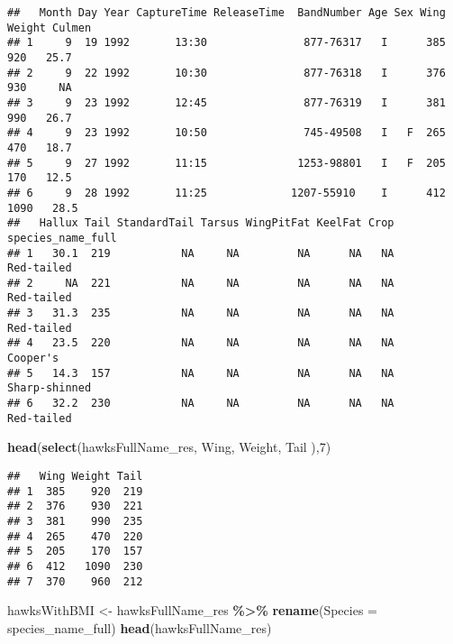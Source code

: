 \documentclass[
]{article}
\newenvironment{Shaded}{\begin{snugshade}}{\end{snugshade}}
\newcommand{\AttributeTok}[1]{\textcolor[rgb]{0.13,0.29,0.53}{#1}}
\newcommand{\DecValTok}[1]{\textcolor[rgb]{0.00,0.00,0.81}{#1}}
\newcommand{\FunctionTok}[1]{\textcolor[rgb]{0.13,0.29,0.53}{\textbf{#1}}}
\newcommand{\NormalTok}[1]{#1}
\newcommand{\OtherTok}[1]{\textcolor[rgb]{0.56,0.35,0.01}{#1}}
\newcommand{\SpecialCharTok}[1]{\textcolor[rgb]{0.81,0.36,0.00}{\textbf{#1}}}
\begin{document}
\begin{verbatim}
##   Month Day Year CaptureTime ReleaseTime  BandNumber Age Sex Wing Weight Culmen
## 1     9  19 1992       13:30               877-76317   I      385    920   25.7
## 2     9  22 1992       10:30               877-76318   I      376    930     NA
## 3     9  23 1992       12:45               877-76319   I      381    990   26.7
## 4     9  23 1992       10:50               745-49508   I   F  265    470   18.7
## 5     9  27 1992       11:15              1253-98801   I   F  205    170   12.5
## 6     9  28 1992       11:25             1207-55910    I      412   1090   28.5
##   Hallux Tail StandardTail Tarsus WingPitFat KeelFat Crop species_name_full
## 1   30.1  219           NA     NA         NA      NA   NA        Red-tailed
## 2     NA  221           NA     NA         NA      NA   NA        Red-tailed
## 3   31.3  235           NA     NA         NA      NA   NA        Red-tailed
## 4   23.5  220           NA     NA         NA      NA   NA          Cooper's
## 5   14.3  157           NA     NA         NA      NA   NA     Sharp-shinned
## 6   32.2  230           NA     NA         NA      NA   NA        Red-tailed
\end{verbatim}

\begin{Shaded}
\begin{Highlighting}[]
\FunctionTok{head}\NormalTok{(}\FunctionTok{select}\NormalTok{(hawksFullName\_res, Wing, Weight, Tail ),}\DecValTok{7}\NormalTok{)}
\end{Highlighting}
\end{Shaded}

\begin{verbatim}
##   Wing Weight Tail
## 1  385    920  219
## 2  376    930  221
## 3  381    990  235
## 4  265    470  220
## 5  205    170  157
## 6  412   1090  230
## 7  370    960  212
\end{verbatim}

\begin{Shaded}
\begin{Highlighting}[]
\NormalTok{hawksWithBMI }\OtherTok{\textless{}{-}}\NormalTok{ hawksFullName\_res }\SpecialCharTok{\%\textgreater{}\%} \FunctionTok{rename}\NormalTok{(}\AttributeTok{Species =}\NormalTok{ species\_name\_full)}
\FunctionTok{head}\NormalTok{(hawksFullName\_res)}
\end{Highlighting}
\end{Shaded}
\end{document}
